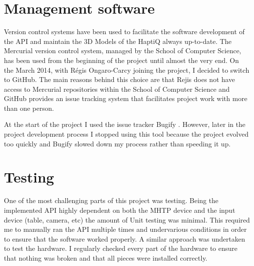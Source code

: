 \section{Management software}
Version control systems have been used to facilitate the software development of the API and maintain the 3D Models of the HaptiQ always up-to-date. The Mercurial version control system, managed by the School of Computer Science, has been used from the beginning of the project until almost the very end. On the  March 2014, with Régis Ongaro-Carcy joining the project, I decided to switch to GitHub. The main reasons behind this choice are that Rejis does not have access to Mercurial repositories within the School of Computer Science and GitHub provides an issue tracking system that facilitates project work with more than one person.  

At the start of the project I used the issue tracker Bugify . However, later in the project development process I stopped using this tool because the project evolved too quickly and Bugify slowed down my process rather than speeding it up. 

\section{Testing}
One of the most challenging parts of this project was testing. Being the implemented API highly dependent on both the MHTP device and the input device (table, camera, etc) the amount of Unit testing was minimal. This required me to manually ran the API multiple times and undervarious conditions in order to ensure that the software worked properly. A similar approach was undertaken to test the hardware. I regularly checked every part of the hardware to ensure that nothing was broken and that all pieces were installed correctly.
